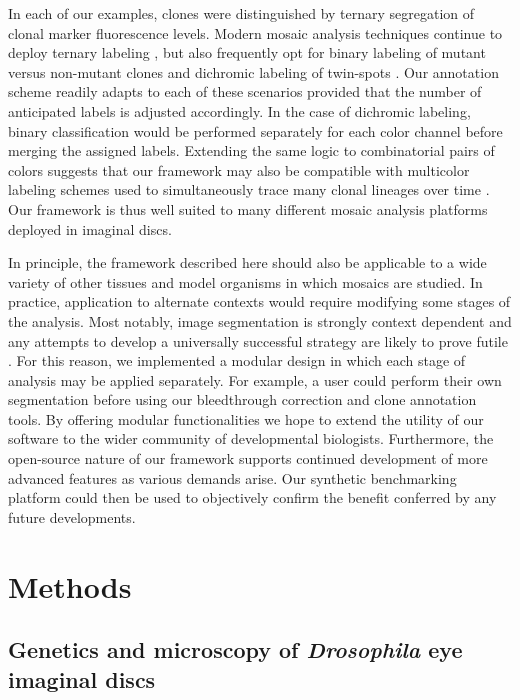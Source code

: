 In each of our examples, clones were distinguished by ternary segregation of clonal marker fluorescence levels. Modern mosaic analysis techniques continue to deploy ternary labeling \cite{Gambis2011,Dourlen2013}, but also frequently opt for binary labeling of mutant versus non-mutant clones \cite{Fisher2017,Wu2007,Zhou2016} and dichromic labeling of twin-spots \cite{Heffern2009,Yu2010}. Our annotation scheme readily adapts to each of these scenarios provided that the number of anticipated labels is adjusted accordingly. In the case of dichromic labeling, binary classification would be performed separately for each color channel before merging the assigned labels. Extending the same logic to combinatorial pairs of colors suggests that our framework may also be compatible with multicolor labeling schemes used to simultaneously trace many clonal lineages over time \cite{Denes2013,Hadjieconomou2011,Hampel2011}. Our framework is thus well suited to many different mosaic analysis platforms deployed in imaginal discs.

In principle, the framework described here should also be applicable to a wide variety of other tissues \cite{Neufeld1998,Tworoger1999} and model organisms \cite{Collins2010,Munoz-Jimenez2017,Wang2007} in which mosaics are studied. In practice, application to alternate contexts would require modifying some stages of the analysis. Most notably, image segmentation is strongly context dependent and any attempts to develop a universally successful strategy are likely to prove futile \cite{Meijering2012}. For this reason, we implemented a modular design in which each stage of analysis may be applied separately. For example, a user could perform their own segmentation before using our bleedthrough correction and clone annotation tools. By offering modular functionalities we hope to extend the utility of our software to the wider community of developmental biologists. Furthermore, the open-source nature of our framework supports continued development of more advanced features as various demands arise. Our synthetic benchmarking platform could then be used to objectively confirm the benefit conferred by any future developments.




\section{Methods}

\subsection{Genetics and microscopy of \textit{Drosophila} eye imaginal discs}

